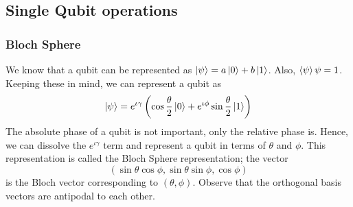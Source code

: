 \documentclass{article}
\begin{document}
\subsection{Single Qubit operations}

\subsubsection{Bloch Sphere}
We know that a qubit can be represented as $\ket{\psi} = a\ket{0} + b\ket{1}$. Also, $\braket{\psi}{\psi} = 1$. Keeping these in mind, we can represent a qubit as $$\ket{\psi} = e^{\iota \gamma}\left( \cos{\frac{\theta}{2}}\ket{0} + e^{\iota \phi}\sin{\frac{\theta}{2}}\ket{1} \right)$$ The absolute phase of a qubit is not important, only the relative phase is. Hence, we can dissolve the $e^{\iota \gamma}$ term and represent a qubit in terms of $\theta$ and $\phi$. This representation is called the Bloch Sphere representation; the vector $$\left( \sin{\theta}\cos{\phi}, \sin{\theta}\sin{\phi}, \cos{\phi} \right)$$ is the Bloch vector corresponding to $\left(\theta , \phi \right)$. Observe that the orthogonal basis vectors are antipodal to each other.
\end{document}
